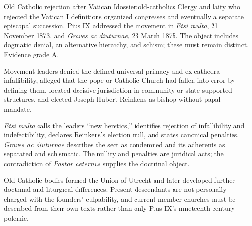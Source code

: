 \begin{heresydossier}{Old Catholic rejection after Vatican I}{dossier:old-catholics}
\objectfield Clergy and laity who rejected the Vatican I definitions organized congresses and eventually a separate episcopal succession. Pius IX addressed the movement in \emph{Etsi multa}, 21 November 1873, and \emph{Graves ac diuturnae}, 23 March 1875. The object includes dogmatic denial, an alternative hierarchy, and schism; these must remain distinct. Evidence grade A.

\propositionfield Movement leaders denied the defined universal primacy and ex cathedra infallibility, alleged that the pope or Catholic Church had fallen into error by defining them, located decisive jurisdiction in community or state-supported structures, and elected Joseph Hubert Reinkens as bishop without papal mandate.

\responsefield \emph{Etsi multa} calls the leaders ``new heretics,'' identifies rejection of infallibility and indefectibility, declares Reinkens's election null, and states canonical penalties. \emph{Graves ac diuturnae} describes the sect as condemned and its adherents as separated and schismatic. The nullity and penalties are juridical acts; the contradiction of \emph{Pastor aeternus} supplies the doctrinal object.

\aftermathfield Old Catholic bodies formed the Union of Utrecht and later developed further doctrinal and liturgical differences. Present descendants are not personally charged with the founders' culpability, and current member churches must be described from their own texts rather than only Pius IX's nineteenth-century polemic.
\end{heresydossier}

